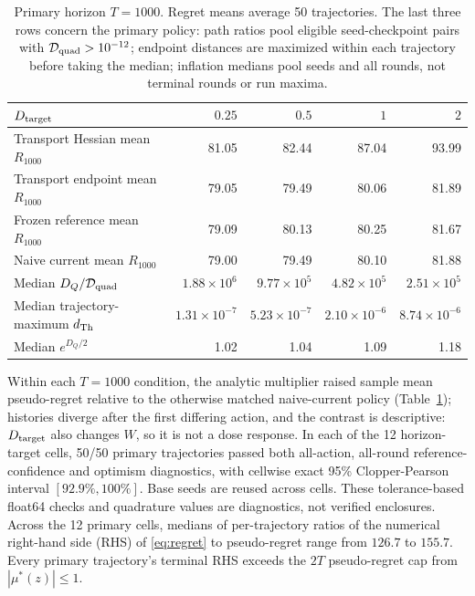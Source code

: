 \documentclass[10pt]{article}
\theoremstyle{definition}
\begin{document}
\begin{table}[H]
\centering\footnotesize
\begin{tabular}{@{}lrrrr@{}}
\toprule
$D_{\rm target}$ & $0.25$ & $0.5$ & $1$ & $2$ \\
\midrule
Transport Hessian mean $R_{1000}$ & 81.05 & 82.44 & 87.04 & 93.99 \\
Transport endpoint mean $R_{1000}$ & 79.05 & 79.49 & 80.06 & 81.89 \\
Frozen reference mean $R_{1000}$ & 79.09 & 80.13 & 80.25 & 81.67 \\
Naive current mean $R_{1000}$ & 79.00 & 79.49 & 80.10 & 81.88 \\
\midrule
Median $D_Q/\mathcal D_{\rm quad}$ & $1.88\times10^6$ & $9.77\times10^5$ & $4.82\times10^5$ & $2.51\times10^5$ \\
Median trajectory-maximum $d_{\rm Th}$ & $1.31\times10^{-7}$ & $5.23\times10^{-7}$ & $2.10\times10^{-6}$ & $8.74\times10^{-6}$ \\
Median $e^{D_Q/2}$ & 1.02 & 1.04 & 1.09 & 1.18 \\
\bottomrule
\end{tabular}
\caption{Primary horizon $T=1000$. Regret means average 50 trajectories. The last three rows concern the primary policy: path ratios pool eligible seed-checkpoint pairs with $\mathcal D_{\rm quad}>10^{-12}$; endpoint distances are maximized within each trajectory before taking the median; inflation medians pool seeds and all rounds, not terminal rounds or run maxima.}
\label{tab:audit}
\end{table}

Within each $T=1000$ condition, the analytic multiplier raised sample
mean pseudo-regret relative to the otherwise matched naive-current
policy (Table~\ref{tab:audit}); histories diverge after the first
differing action, and the contrast is descriptive:
$D_{\rm target}$ also changes $W$, so it is not a dose response. In each of the 12 horizon-target cells, 50/50 primary trajectories passed both all-action, all-round reference-confidence and optimism diagnostics, with cellwise exact 95\% Clopper-Pearson interval $[92.9\%,100\%]$. Base seeds are reused across cells. These tolerance-based float64 checks and quadrature values are diagnostics, not verified enclosures. Across the 12 primary cells, medians of per-trajectory ratios of the numerical right-hand side (RHS) of \eqref{eq:regret} to pseudo-regret range from $126.7$ to $155.7$. Every primary trajectory's terminal RHS exceeds the $2T$ pseudo-regret cap from $|\mu^*(z)|\le1$.
\end{document}
